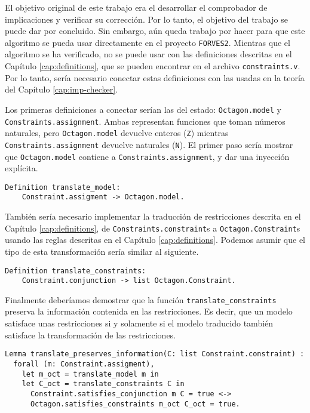 El objetivo original de este trabajo era el desarrollar el comprobador de 
implicaciones y verificar su corrección. Por lo tanto, el objetivo del 
trabajo se puede dar por concluido. Sin embargo, aún queda trabajo por
hacer para que este algoritmo se pueda usar directamente en el proyecto
\verb|FORVES2|. Mientras que el algoritmo se ha verificado, no se puede
usar con las definiciones descritas en el Capítulo \ref{cap:definitions},
que se pueden encontrar en el archivo \texttt{constraints.v}. Por
lo tanto, sería necesario conectar estas definiciones con las usadas en
la teoría del Capítulo \ref{cap:imp-checker}.

Los primeras definiciones a conectar serían las del estado:
\texttt{Octagon.model} y \texttt{Constraints.assignment}.
Ambas representan funciones que toman números naturales, pero 
\texttt{Octagon.model} devuelve enteros (\texttt{Z}) mientras
\texttt{Constraints.assignment} devuelve naturales (\texttt{N}).
El primer paso sería mostrar que \texttt{Octagon.model} contiene a
\texttt{Constraints.assignment}, y dar una inyección explícita.
\begin{verbatim}
Definition translate_model:
    Constraint.assigment -> Octagon.model.
\end{verbatim}

También sería necesario implementar la traducción de restricciones descrita en el
Capítulo \ref{cap:definitions}, de \texttt{Constraints.constraint}s a
\texttt{Octagon.Constraint}s usando las reglas descritas en el Capítulo
\ref{cap:definitions}. Podemos asumir que el tipo de esta transformación sería similar al
siguiente.
\begin{verbatim}
Definition translate_constraints: 
    Constraint.conjunction -> list Octagon.Constraint.
\end{verbatim}

\noindent Finalmente deberíamos demostrar que la función \texttt{translate_constraints}
preserva la información contenida en las restricciones.
Es decir, que un modelo satisface unas restricciones si y solamente si el modelo traducido
también satisface la transformación de las restricciones.

\begin{verbatim}
Lemma translate_preserves_information(C: list Constraint.constraint) :
  forall (m: Constraint.assigment),
    let m_oct = translate_model m in
    let C_oct = translate_constraints C in
      Constraint.satisfies_conjunction m C = true <->
      Octagon.satisfies_constraints m_oct C_oct = true.
\end{verbatim}

